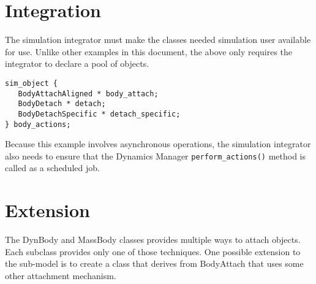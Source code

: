 \section{Integration}
The simulation integrator must make the \partxname classes needed
simulation user available for use.
Unlike other examples in this document,
the above only requires the integrator to declare a pool of objects.
\begin{verbatim}
sim_object {
   BodyAttachAligned * body_attach;
   BodyDetach * detach;
   BodyDetachSpecific * detach_specific;
} body_actions;
\end{verbatim}

Because this example involves asynchronous operations,
the simulation integrator also needs
to ensure that the Dynamics Manager {\tt perform\_actions()} method is called
as a scheduled job.


\section{Extension}
The DynBody and MassBody classes provides multiple ways to attach objects.
Each \partxname subclass provides only one of those techniques.
One possible extension to the sub-model is to create a class that
derives from BodyAttach that uses some other attachment
mechanism.
